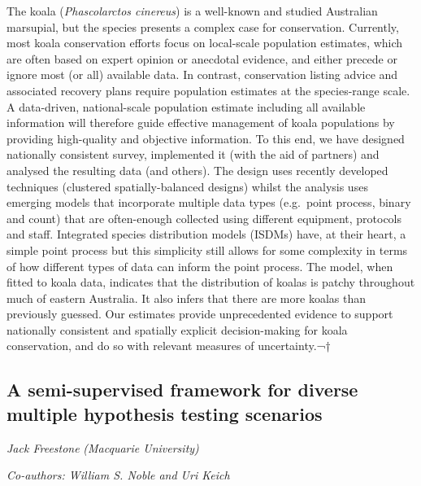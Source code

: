 \documentclass[
]{scrreprt}
\begin{document}
The koala (\emph{Phascolarctos cinereus}) is a well-known and studied
Australian marsupial, but the species presents a complex case for
conservation. Currently, most koala conservation efforts focus on
local-scale population estimates, which are often based on expert
opinion or anecdotal evidence, and either precede or ignore most (or
all) available data. In contrast, conservation listing advice and
associated recovery plans require population estimates at the
species-range scale. A data-driven, national-scale population estimate
including all available information will therefore guide effective
management of koala populations by providing high-quality and objective
information. To this end, we have designed nationally consistent survey,
implemented it (with the aid of partners) and analysed the resulting
data (and others). The design uses recently developed techniques
(clustered spatially-balanced designs) whilst the analysis uses emerging
models that incorporate multiple data types (e.g.~point process, binary
and count) that are often-enough collected using different equipment,
protocols and staff. Integrated species distribution models (ISDMs)
have, at their heart, a simple point process but this simplicity still
allows for some complexity in terms of how different types of data can
inform the point process. The model, when fitted to koala data,
indicates that the distribution of koalas is patchy throughout much of
eastern Australia. It also infers that there are more koalas than
previously guessed. Our estimates provide unprecedented evidence to
support nationally consistent and spatially explicit decision-making for
koala conservation, and do so with relevant measures of uncertainty.¬†

\subsection{A semi-supervised framework for diverse multiple hypothesis
testing
scenarios}\label{a-semi-supervised-framework-for-diverse-multiple-hypothesis-testing-scenarios}

\emph{Jack Freestone} \emph{(Macquarie
University)}

\emph{Co-authors: William S. Noble and Uri Keich}

\setlength{\parskip}{0.5em}
\end{document}
